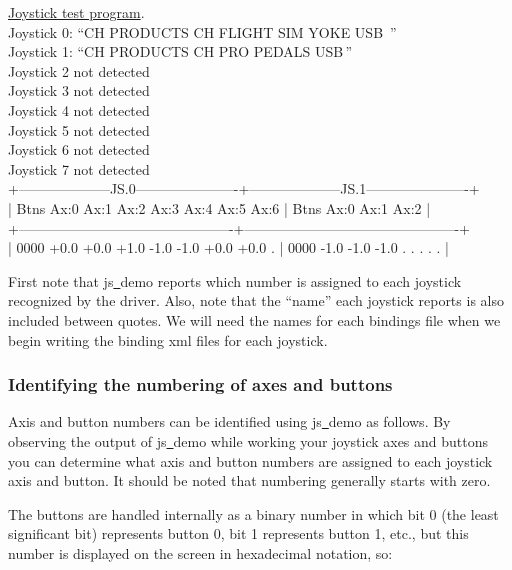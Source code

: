 \begin{ttfamily}
\tiny
\noindent
\underline{Joystick test program}.\\
Joystick 0: ``CH PRODUCTS CH FLIGHT SIM YOKE USB\, ''\\
Joystick 1: ``CH PRODUCTS CH PRO PEDALS USB\,''\\
Joystick 2 not detected\\
Joystick 3 not detected\\
Joystick 4 not detected\\
Joystick 5 not detected\\
Joystick 6 not detected\\
Joystick 7 not detected\\
+--------------------JS.0----------------------+--------------------JS.1----------------------+\\
| Btns Ax:0 Ax:1 Ax:2 Ax:3 Ax:4 Ax:5 Ax:6      | Btns Ax:0 Ax:1 Ax:2                          |\\
+----------------------------------------------+----------------------------------------------+\\
| 0000 +0.0 +0.0 +1.0 -1.0 -1.0 +0.0 +0.0   .  | 0000 -1.0 -1.0 -1.0   .    .    .    .    .  |\\
\end{ttfamily}

\noindent
First note that js\underline{~}demo reports which number is assigned to each joystick recognized by the driver.  Also, note that the ``name'' each joystick reports is also included between quotes.  We will need the names for each bindings file when we begin writing the binding xml files for each joystick.

\subsubsection{Identifying the numbering of axes and buttons\label{identifying}}
Axis and button numbers can be identified using js\underline{~}demo as follows. By observing the output of js\underline{~}demo while working your joystick axes and buttons you can determine what axis and button numbers are assigned to each joystick axis and button. It should be noted that numbering generally starts with zero.

The buttons are handled internally as a binary number in which bit 0 (the least significant bit) represents button 0, bit 1 represents button 1, etc., but this number is displayed on the screen in hexadecimal notation, so:
\medskip

